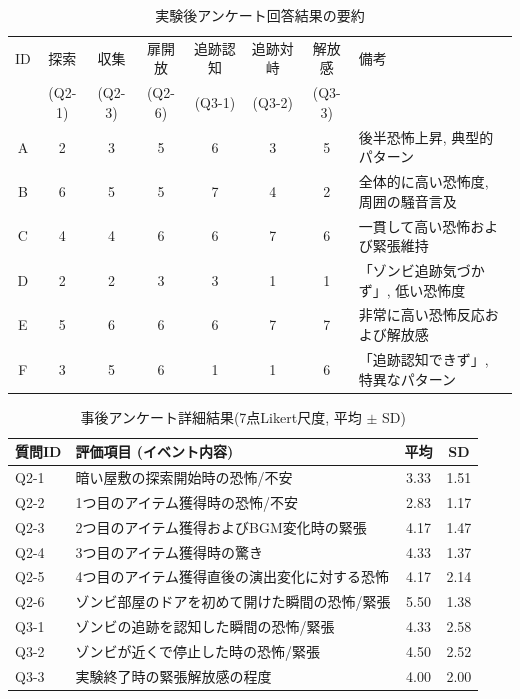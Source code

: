 \documentclass[book,paper=a4,fontsize=10pt,jafontscale=0.92]{jlreq}
\begin{document}
\begin{table}[t]
  \centering
  \caption{実験後アンケート回答結果の要約}
  \label{tab:survey_results}
  \begin{tabular}{c|c|c|c|c|c|c|l}
    \hline
    ID & 探索 & 収集 & 扉開放 & 追跡認知 & 追跡対峙 & 解放感 & 備考 \\
    & (Q2-1) & (Q2-3) & (Q2-6) & (Q3-1) & (Q3-2) & (Q3-3) & \\
    \hline \hline
    A & 2 & 3 & 5 & 6 & 3 & 5 & 後半恐怖上昇, 典型的パターン \\
    \hline
    B & 6 & 5 & 5 & 7 & 4 & 2 & 全体的に高い恐怖度, 周囲の騒音言及 \\
    \hline
    C & 4 & 4 & 6 & 6 & 7 & 6 & 一貫して高い恐怖および緊張維持 \\
    \hline
    D & 2 & 2 & 3 & 3 & 1 & 1 & 「ゾンビ追跡気づかず」, 低い恐怖度 \\
    \hline
    E & 5 & 6 & 6 & 6 & 7 & 7 & 非常に高い恐怖反応および解放感 \\
    \hline
    F & 3 & 5 & 6 & 1 & 1 & 6 & 「追跡認知できず」, 特異なパターン \\
    \hline
  \end{tabular}
\end{table}

\begin{table}[t]
\centering
\caption{事後アンケート詳細結果(7点Likert尺度, 平均 $\pm$ SD)}
\label{tab:questionnaire_detail}
\begin{tabular}{lp{8cm}cc}
\hline
質問ID & 評価項目 (イベント内容) & 平均 & SD \\
\hline
Q2-1 & 暗い屋敷の探索開始時の恐怖/不安 & 3.33 & 1.51 \\
Q2-2 & 1つ目のアイテム獲得時の恐怖/不安 & 2.83 & 1.17 \\
Q2-3 & 2つ目のアイテム獲得およびBGM変化時の緊張 & 4.17 & 1.47 \\
Q2-4 & 3つ目のアイテム獲得時の驚き & 4.33 & 1.37 \\
Q2-5 & 4つ目のアイテム獲得直後の演出変化に対する恐怖 & 4.17 & 2.14 \\
Q2-6 & ゾンビ部屋のドアを初めて開けた瞬間の恐怖/緊張 & 5.50 & 1.38 \\
Q3-1 & ゾンビの追跡を認知した瞬間の恐怖/緊張 & 4.33 & 2.58 \\
Q3-2 & ゾンビが近くで停止した時の恐怖/緊張 & 4.50 & 2.52 \\
Q3-3 & 実験終了時の緊張解放感の程度 & 4.00 & 2.00 \\
\hline
\end{tabular}
\end{table}
\end{document}
